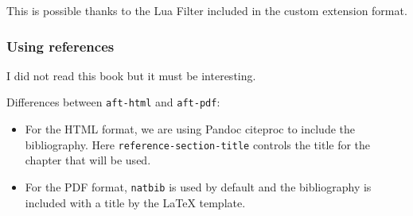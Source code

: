 \documentclass[
]{aft}
\providecommand{\tightlist}{%
  \setlength{\itemsep}{0pt}\setlength{\parskip}{0pt}}\usepackage{longtable,booktabs,array}
\begin{document}
This is possible thanks to the Lua Filter included in the custom
extension format.

\hypertarget{using-references}{%
\subsubsection*{Using references}\label{using-references}}

I did not read this book \citep{CameronTrivedi2013} but it must be
interesting.

Differences between \texttt{aft-html} and \texttt{aft-pdf}:

\begin{itemize}
\tightlist
\item
  For the HTML format, we are using Pandoc citeproc to include the
  bibliography. Here \texttt{reference-section-title} controls the title
  for the chapter that will be used.
\item
  For the PDF format, \texttt{natbib} is used by default and the
  bibliography is included with a title by the LaTeX template.
\end{itemize}


  
\end{document}
